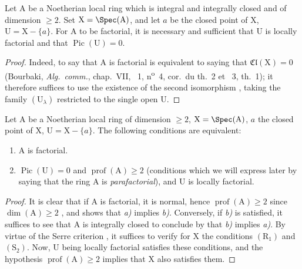 \begin{corollary}[21.6.13]
\label{IV.21.6.13}
Let $\mathrm{A}$ be a Noetherian local ring which is integral and integrally closed and of dimension $\geq 2$.
Set $\mathrm{X}=\Spec(\mathrm{A})$, and let $a$ be the closed point of $\mathrm{X}$, $\mathrm{U}=\mathrm{X}-\{a\}$.
For $\mathrm{A}$ to be factorial, it is necessary and sufficient that $\mathrm{U}$ is locally factorial and that $\operatorname{Pic}(\mathrm{U})=0$.
\end{corollary}

\begin{proof}
Indeed, to say that $\mathrm{A}$ is factorial is equivalent to saying that $\mathfrak{Cl}(\mathrm{X})=0$ (Bourbaki, \emph{Alg.\ comm.}, chap.~VII, \textsection~1, n\textsuperscript{o}~4, cor.\ du th.~2 et \textsection~3, th.~1);
it therefore suffices to use the existence of the second isomorphism , taking the family $(\mathrm{U}_\lambda)$ restricted to the single open $\mathrm{U}$.
\end{proof}

\begin{corollary}[21.6.14]
\label{IV.21.6.14}
Let $\mathrm{A}$ be a Noetherian local ring of dimension $\geq 2$, $\mathrm{X}=\Spec(\mathrm{A})$, $a$ the closed point of $\mathrm{X}$, $\mathrm{U}=\mathrm{X}-\{a\}$.
The following conditions are equivalent:
\begin{enumerate}[label=\emph{\alph*)}]
  \item $\mathrm{A}$ is factorial.
  \item $\operatorname{Pic}(\mathrm{U})=0$ and $\operatorname{prof}(\mathrm{A})\geq 2$ (conditions which we will express later  by saying that the ring $\mathrm{A}$ is \emph{parafactorial}), and $\mathrm{U}$ is locally factorial.
\end{enumerate}
\end{corollary}

\begin{proof}
It is clear that if $\mathrm{A}$ is factorial, it is normal, hence $\operatorname{prof}(\mathrm{A})\geq 2$ since $\dim(\mathrm{A})\geq 2$ , and  shows that \emph{a)} implies \emph{b)}.
Conversely, if \emph{b)} is satisfied, it suffices to see that $\mathrm{A}$ is integrally closed to conclude by  that \emph{b)} implies \emph{a)}.
By virtue of the Serre criterion , it suffices to verify for $\mathrm{X}$ the conditions $(\mathrm{R}_1)$ and $(\mathrm{S}_2)$.
Now, $\mathrm{U}$ being locally factorial satisfies these conditions, and the hypothesis $\operatorname{prof}(\mathrm{A})\geq 2$ implies that $\mathrm{X}$ also satisfies them.
\end{proof}



